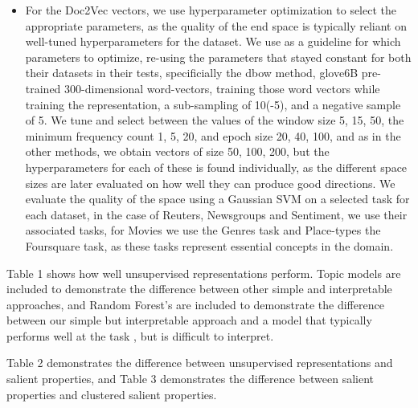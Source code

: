 \begin{itemize}
	\item For the Doc2Vec vectors, we use hyperparameter optimization to select the appropriate parameters, as the quality of the end space is typically reliant on well-tuned hyperparameters for the dataset. We use \cite{Lau2014} as a guideline for which parameters to optimize, re-using the parameters that stayed constant for both their datasets in their tests, specificially the dbow method, glove6B pre-trained 300-dimensional word-vectors, training those word vectors while training the representation, a sub-sampling of 10(-5), and a negative sample of 5. We tune and select between the values of the window size {5, 15, 50}, the minimum frequency count {1, 5, 20}, and epoch size {20, 40, 100}, and as in the other methods, we obtain vectors of size {50, 100, 200}, but the hyperparameters for each of these is found individually, as the different space sizes are later evaluated on how well they can produce good directions. We evaluate the quality of the space using a Gaussian SVM on a selected task for each dataset, in the case of Reuters, Newsgroups and Sentiment, we use their associated tasks, for Movies we use the Genres task and Place-types the Foursquare task, as these tasks represent essential concepts in the domain. 
	
	
\end{itemize}

Table 1 shows how well unsupervised representations perform. Topic models are included to demonstrate the difference between other simple and interpretable approaches, and Random Forest's are included to demonstrate the difference between our simple but interpretable approach and a model that typically performs well at the task \cite{Fern2014}, but is  difficult to interpret.

Table 2 demonstrates the difference between unsupervised representations and salient properties, and Table 3 demonstrates the difference between salient properties and clustered salient properties.